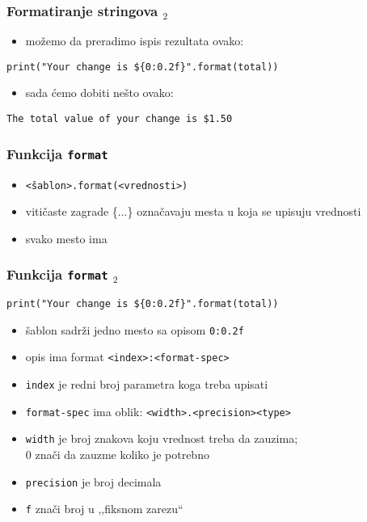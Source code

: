 \documentclass[utf8,compress]{beamer}
\begin{document}
\begin{frame}[fragile]
  \frametitle{Formatiranje stringova $_2$}
  \begin{itemize}
    \item možemo da preradimo ispis rezultata ovako:
  \end{itemize}
\begin{verbatim}
print("Your change is ${0:0.2f}".format(total))
\end{verbatim}
  \begin{itemize}
    \item sada ćemo dobiti nešto ovako:
  \end{itemize}
\begin{verbatim}
The total value of your change is $1.50
\end{verbatim}
\end{frame}

\begin{frame}[fragile]
  \frametitle{Funkcija \texttt{format}}
  \begin{itemize}
    \item \texttt{<šablon>.format(<vrednosti>)}
    \item vitičaste zagrade \{...\} označavaju mesta u koja se upisuju vrednosti
    \item svako mesto ima 
  \end{itemize}
\end{frame}

\begin{frame}[fragile]
  \frametitle{Funkcija \texttt{format} $_2$}
\begin{verbatim}
print("Your change is ${0:0.2f}".format(total))
\end{verbatim}
  \begin{itemize}
    \item šablon sadrži jedno mesto sa opisom \texttt{0:0.2f}
    \item opis ima format \texttt{<index>:<format-spec>}
    \item \texttt{index} je redni broj parametra koga treba upisati
    \item \texttt{format-spec} ima oblik: \texttt{<width>.<precision><type>}
    \item \texttt{width} je broj znakova koju vrednost treba da zauzima; \\0 znači da zauzme koliko je potrebno
    \item \texttt{precision} je broj decimala
    \item \texttt{f} znači broj u ,,fiksnom zarezu``
  \end{itemize}
\end{frame}
\end{document}
